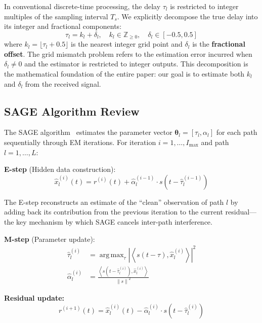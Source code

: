 \documentclass[a4paper,fleqn]{cas-dc}
\DeclareMathOperator*{\argmax}{arg\,max}
\newcommand{\Zz}{\mathbb{Z}}
\newcommand{\norm}[1]{\left\lVert #1 \right\rVert}
\newcommand{\abs}[1]{\left| #1 \right|}
\newcommand{\inner}[2]{\left\langle #1, #2 \right\rangle}
\newcommand{\hb}[1]{\hat{#1}}
\begin{document}
In conventional discrete-time processing, the delay $\tau_l$ is restricted to integer multiples of the sampling interval $T_s$. We explicitly decompose the true delay into its integer and fractional components:
\begin{equation}
\tau_l = k_l + \delta_l, \quad k_l \in \Zz_{\geq 0}, \quad \delta_l \in [-0.5, 0.5]
\label{eq:decomp}
\end{equation}
where $k_l = \lfloor \tau_l + 0.5 \rfloor$ is the nearest integer grid point and $\delta_l$ is the \textbf{fractional offset}. The grid mismatch problem refers to the estimation error incurred when $\delta_l \neq 0$ and the estimator is restricted to integer outputs. This decomposition is the mathematical foundation of the entire paper: our goal is to estimate both $k_l$ and $\delta_l$ from the received signal.

\subsection{SAGE Algorithm Review}

The SAGE algorithm~\cite{fleury1999} estimates the parameter vector $\bm{\theta}_l = [\tau_l, \alpha_l]$ for each path sequentially through EM iterations. For iteration $i = 1, \ldots, I_{\max}$ and path $l = 1, \ldots, L$:

\textbf{E-step} (Hidden data construction):
\begin{equation}
\hb{x}_l^{(i)}(t) = r^{(i)}(t) + \hb{\alpha}_l^{(i-1)} \cdot s\!\left(t - \hb{\tau}_l^{(i-1)}\right)
\label{eq:estep}
\end{equation}

The E-step reconstructs an estimate of the ``clean'' observation of path $l$ by adding back its contribution from the previous iteration to the current residual---the key mechanism by which SAGE cancels inter-path interference.

\textbf{M-step} (Parameter update):
\begin{align}
\hb{\tau}_l^{(i)} &= \argmax_{\tau} \abs{\inner{s(t-\tau)}{\hb{x}_l^{(i)}}}^2 \label{eq:mstep2} \\
\hb{\alpha}_l^{(i)} &= \frac{\inner{s(t-\hb{\tau}_l^{(i)})}{\hb{x}_l^{(i)}}}{\norm{s}^2} \label{eq:amp}
\end{align}

\textbf{Residual update:}
\begin{equation}
r^{(i+1)}(t) = \hb{x}_l^{(i)}(t) - \hb{\alpha}_l^{(i)} \cdot s\!\left(t - \hb{\tau}_l^{(i)}\right)
\label{eq:resid}
\end{equation}
\end{document}
